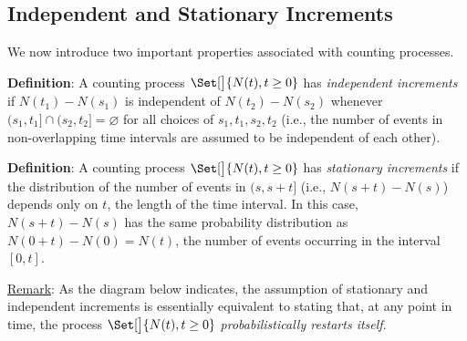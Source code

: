 \subsection*{Independent and Stationary Increments}
We now introduce two important properties associated with counting processes.
\begin{Regular}
    \textbf{Definition}: A counting process $ \Set[\big]{N(t),t\ge 0} $ has \emph{independent increments} if $ N(t_1)-N(s_1) $ is
    independent of $ N(t_2)-N(s_2) $ whenever $ (s_1,t_1]\cap (s_2,t_2]=\varnothing $ for all choices of $ s_1,t_1,s_2,t_2 $
    (i.e., the number of events in non-overlapping time intervals are assumed to be independent of each other).
\end{Regular}
\begin{Regular}
    \textbf{Definition}: A counting process $ \Set[\big]{N(t),t\ge 0} $ has \emph{stationary increments} if the distribution
    of the number of events in $ (s,s+t] $ (i.e., $ N(s+t)-N(s) $) depends only on $ t $, the length of the time interval.
    In this case, $ N(s+t)-N(s) $ has the same probability distribution as $ N(0+t)-N(0)=N(t) $, the number of events
    occurring in the interval $ [0,t] $.
\end{Regular}
\underline{Remark}: As the diagram below indicates, the assumption of stationary and independent
increments is essentially equivalent to stating that, at any point in time, the process
$ \Set[\big]{N(t),t\ge 0} $ \emph{probabilistically restarts itself}.
\begin{figure}[!htbp]
    \centering
\end{figure}
